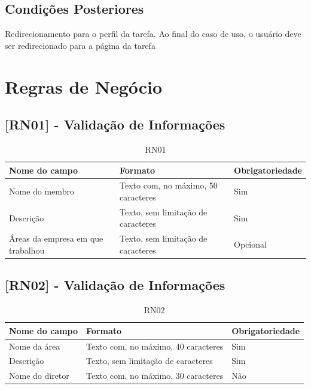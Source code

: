 \begin{apendicesenv}
\subsection{Condições Posteriores}

Redirecionamento para o perfil da tarefa. Ao final do caso de uso, o usuário deve ser redirecionado para a página da tarefa



\section{Regras de Negócio}

\subsection{[RN01] - Validação de Informações}

\begin{table}[!h]
\centering
\caption{RN01}
\label{RN01}
\begin{tabular}{|p{4cm}|p{8cm}|p{3cm}|}
\hline
Nome do campo                     & Formato                             & Obrigatoriedade \\ \hline
Nome do membro                    & Texto com, no máximo, 50 caracteres & Sim             \\ \hline
Descrição                         & Texto, sem limitação de caracteres  & Sim             \\ \hline
Áreas da empresa em que trabalhou & Texto, sem limitação de caracteres  & Opcional        \\ \hline
\end{tabular}
\end{table}

\clearpage{}


\subsection{[RN02] - Validação de Informações}

\begin{table}[!h]
\centering
\caption{RN02}
\label{RN02}
\begin{tabular}{|p{4cm}|p{8cm}|p{3cm}|}
\hline
Nome do campo   & Formato                             & Obrigatoriedade \\ \hline
Nome da área    & Texto com, no máximo, 40 caracteres & Sim             \\ \hline
Descrição       & Texto, sem limitação de caracteres  & Sim             \\ \hline
Nome do diretor & Texto com, no máximo, 30 caracteres & Não             \\ \hline
\end{tabular}
\end{table}



\end{apendicesenv}
